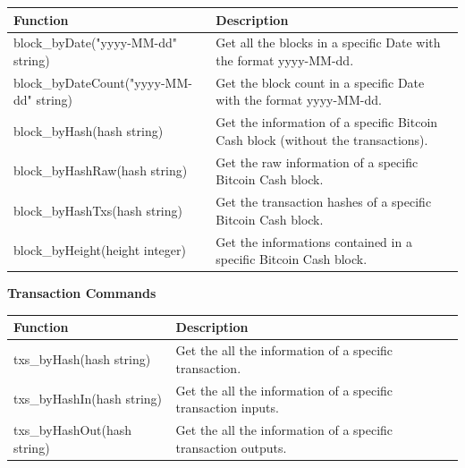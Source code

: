 \begin{table}[!ht]
    \centering
    \begin{tabular}{||l|p{6cm}||}
    \hline
    \textbf{Function}                          & \textbf{Description}                                                  \\ \hline
    block\_byDate("yyyy-MM-dd" string)                 & Get all the blocks in a specific Date with the format yyyy-MM-dd.                          \\ \hline
    block\_byDateCount("yyyy-MM-dd" string)    & Get the block count in a specific Date with the format yyyy-MM-dd.             \\ \hline
    block\_byHash(hash string)                 & Get the information of a specific Bitcoin Cash block (without the transactions).         \\ \hline
    block\_byHashRaw(hash string)              & Get the raw information of a specific Bitcoin Cash block.             \\ \hline
    block\_byHashTxs(hash string)              & Get the transaction hashes of a specific Bitcoin Cash block.             \\ \hline
    block\_byHeight(height integer)            & Get the informations contained in a specific Bitcoin Cash block.                     \\ \hline
    \end{tabular}
    \end{table}\pagebreak
\medskip 
\textbf{Transaction Commands}
\begin{table}[!ht]
    \centering
    \begin{tabular}{||l|p{6cm}||}
    \hline
    \textbf{Function}                          & \textbf{Description}                                                  \\ \hline
    txs\_byHash(hash string)                   & Get the all the information of a specific transaction\footnotemark[2].                          \\ \hline
    txs\_byHashIn(hash string)         & Get the all the information of a specific transaction inputs\footnotemark[2].      \\ \hline
    txs\_byHashOut(hash string)                & Get the all the information of a specific transaction outputs\footnotemark[2].          \\ \hline
    \end{tabular}
    \end{table}
